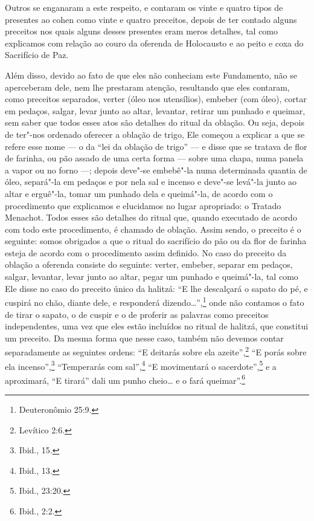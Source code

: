 Outros se enganaram a este respeito, e contaram os vinte e quatro tipos
de presentes ao cohen\starr{} como vinte e quatro preceitos, depois de ter
contado alguns preceitos nos quais alguns desses presentes eram meros
detalhes, tal como explicamos com relação ao couro da oferenda de
Holocausto e ao peito e coxa do Sacrifício de Paz.

Além disso, devido ao fato de que eles não conheciam este Fundamento,
não se aperceberam dele, nem lhe prestaram atenção, resultando que eles
contaram, como preceitos separados, verter (óleo nos utensílios),
embeber (com óleo), cortar em pedaços, salgar, levar junto ao altar,
levantar, retirar um punhado e queimar, sem saber que todos esses atos
são detalhes do ritual da oblação. Ou seja, depois de ter"-nos ordenado
oferecer a oblação de trigo, Ele começou a explicar a que se refere esse
nome --- o da ``lei da oblação de trigo'' --- e disse que se tratava de
flor de farinha, ou pão assado de uma certa forma --- sobre uma chapa,
numa panela a vapor ou no forno ---; depois deve"-se embebê"-la numa
determinada quantia de óleo, separá"-la em pedaços e por nela sal e
incenso e deve"-se levá"-la junto ao altar e erguê"-la, tomar um punhado
dela e queimá"-la, de acordo com o procedimento que explicamos e
elucidamos no lugar apropriado: o Tratado Menachot\starr. Todos esses são
detalhes do ritual que, quando executado de acordo com todo este
procedimento, é chamado de oblação. Assim sendo, o preceito é o
seguinte: somos obrigados a que o ritual do sacrifício do pão ou da flor
de farinha esteja de acordo com o procedimento assim definido. No caso
do preceito da oblação a oferenda consiste do seguinte: verter,
embeber, separar em pedaços, salgar, levantar, levar junto ao altar,
pegar um punhado e queimá"-la, tal como Ele disse no caso do preceito
único da halitzá\starr: ``E lhe descalçará o sapato do pé, e cuspirá no
chão, diante dele, e responderá dizendo\ldots{}'',\footnote{Deuteronômio 25:9.} onde
não contamos o fato de tirar o sapato, o de cuspir e o de proferir as
palavras como preceitos independentes, uma vez que eles estão incluídos
no ritual de halitzá\starr, que constitui um preceito. Da mesma forma que
nesse caso, também não devemos contar separadamente as seguintes ordens:
``E deitarás sobre ela azeite'',\footnote{Levítico 2:6.} ``E porás sobre ela
incenso'',\footnote{Ibid., 15.} ``Temperarás com sal'',\footnote{Ibid., 13.} ``E
movimentará o sacerdote'',\footnote{Ibid., 23:20.} e a aproximará, ``E tirará''
dali um punho cheio\ldots{} e o fará queimar''.\footnote{Ibid., 2:2.}

